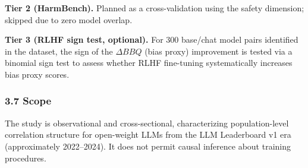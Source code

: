 \textbf{Tier 2 (HarmBench).} Planned as a cross-validation using the safety dimension; skipped due to zero model overlap.

\textbf{Tier 3 (RLHF sign test, optional).} For 300 base/chat model pairs identified in the dataset, the sign of the $\Delta BBQ$ (bias proxy) improvement is tested via a binomial sign test to assess whether RLHF fine-tuning systematically increases bias proxy scores.

\subsubsection{3.7 Scope}

The study is observational and cross-sectional, characterizing population-level correlation structure for open-weight LLMs from the LLM Leaderboard v1 era (approximately 2022--2024). It does not permit causal inference about training procedures.


